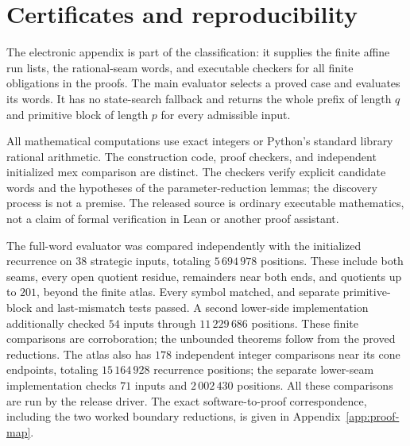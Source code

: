 \documentclass[11pt]{article}
\theoremstyle{remark}\newtheorem{remark}[theorem]{Remark}
\begin{document}
\section{Certificates and reproducibility}\label{sec:computation}
The electronic appendix is part of the classification: it supplies the
finite affine run lists, the rational-seam words, and executable checkers
for all finite obligations in the proofs. The main evaluator selects a
proved case and evaluates its words. It has no state-search fallback and
returns the whole prefix of length $q$ and primitive block of length $p$
for every admissible input.

All mathematical computations use exact integers or Python's standard
library rational arithmetic. The construction code, proof checkers, and
independent initialized mex comparison are distinct. The checkers verify
explicit candidate words and the hypotheses of the parameter-reduction
lemmas; the discovery process is not a premise. The released source is
ordinary executable mathematics, not a claim of formal verification in
Lean or another proof assistant.

The full-word evaluator was compared independently with the initialized
recurrence on $38$ strategic inputs, totaling $5\,694\,978$ positions.
These include both seams, every open quotient residue, remainders near
both ends, and quotients up to $201$, beyond the finite atlas. Every
symbol matched, and separate primitive-block and last-mismatch tests
passed. A second lower-side implementation additionally checked $54$
inputs through $11\,229\,686$ positions. These finite comparisons are
corroboration; the unbounded theorems follow from the proved reductions.
The atlas also has $178$ independent integer comparisons near its cone
endpoints, totaling $15\,164\,928$ recurrence positions; the separate
lower-seam implementation checks $71$ inputs and $2\,002\,430$ positions.
All these comparisons are run by the release driver.
The exact software-to-proof correspondence, including the two worked
boundary reductions, is given in Appendix~\ref{app:proof-map}.

\appendix
\end{document}
